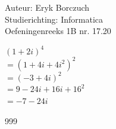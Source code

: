 \documentclass[a4paper]{article}
\begin{document}
  
\noindent \large Auteur: Eryk Borczuch \\
\noindent \large Studierichting: Informatica\\
\noindent \large Oefeningenreeks 1B nr. 17.20\\

\medskip

\normalsize

$(1+2i)^4$\\

$= (1+4i+4i^2)^2$\\

$= (-3+4i)^2$\\

$= 9-24i+16i+16^2$\\

$= -7 -24i$


\begin{thebibliography}{999}
\end{thebibliography}
\end{document}
